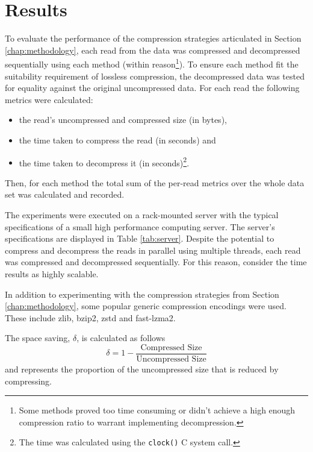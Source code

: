 \chapter{Results} \label{chap:results}



To evaluate the performance of the compression strategies articulated
in Section \ref{chap:methodology}, each read from the data was compressed and
decompressed sequentially using each method (within reason\footnote{Some
methods proved too time consuming or didn't achieve a high enough compression
ratio to warrant implementing decompression.}).
To ensure each method fit the suitability requirement of lossless compression, the
decompressed data was tested for equality against the original uncompressed data.
For each read the following metrics were calculated:
\begin{itemize}
	\item the read's uncompressed and compressed size (in bytes),
	\item the time taken to compress the read (in seconds) and
	\item the time taken to decompress it (in seconds)\footnote{The time was calculated
		using the \texttt{clock()}\cite{c-clock} C system call.}.
\end{itemize}
Then, for each method the total sum of the per-read metrics over the whole data
set was calculated and recorded.

The experiments were executed on a rack-mounted server with the typical
specifications of a small high performance computing server. The server's
specifications are displayed in Table \ref{tab:server}. Despite the potential to
compress and decompress the reads in parallel using multiple threads, each read
was compressed and decompressed sequentially. For this reason, consider the time
results as highly scalable.

In addition to experimenting with the compression strategies from Section
\ref{chap:methodology}, some popular generic compression encodings were used.
These include zlib, bzip2, zstd and fast-lzma2.

The space saving, $\delta$, is calculated as follows
\[ \delta = 1 - \frac{\text{Compressed Size}}{\text{Uncompressed Size}} \]
and represents the proportion of the uncompressed size that is reduced by
compressing.








